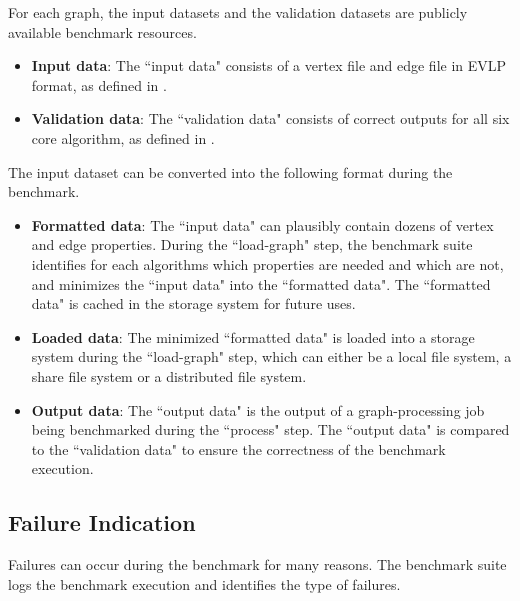 For each graph, the input datasets and the validation datasets are publicly available benchmark resources.

\begin{itemize} 
    \item \textbf{Input data}: The ``input data" consists of a vertex file and edge file in EVLP format, as defined in .
    \item \textbf{Validation data}: The ``validation data" consists of correct outputs for all six core algorithm, as defined in .
\end{itemize}

The input dataset can be converted into the following format during the benchmark.

\begin{itemize}
    \item \textbf{Formatted data}: The ``input data" can plausibly contain dozens of vertex and edge properties. During the ``load-graph" step, the benchmark suite identifies for each algorithms which properties are needed and which are not, and minimizes the ``input data" into the ``formatted data". The ``formatted data" is cached in the storage system for future uses. 
    \item \textbf{Loaded data}: The minimized ``formatted data" is loaded into a storage system during the ``load-graph" step, which can either be a local file system, a share file system or a distributed file system.
    \item \textbf{Output data}: The ``output data" is the output of a graph-processing job being benchmarked during the ``process" step. The ``output data" is compared to the ``validation data" to ensure the correctness of the benchmark execution.
\end{itemize}



\subsection{Failure Indication}
\label{sec:process:execution:failure}
Failures can occur during the benchmark for many reasons. The benchmark suite logs the benchmark execution and identifies the type of failures.



